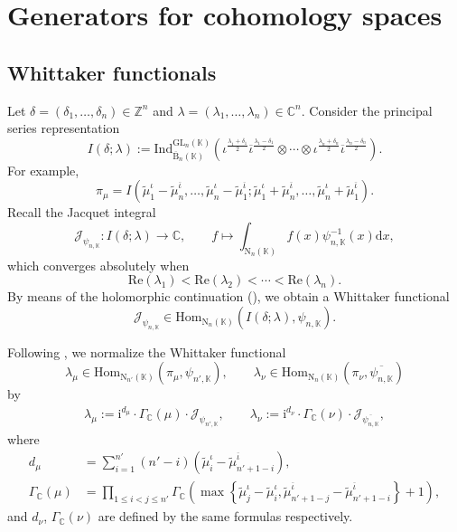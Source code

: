 \documentclass[12pt, a4paper]{amsart}
\newcommand{\CJ}{{\mathcal {J}}}
\newcommand{\RB}{{\mathrm {B}}}
\newcommand{\RN}{{\mathrm {N}}}
\newcommand{\GL}{{\mathrm{GL}}}
\renewcommand{\Re}{{\mathrm{Re}}}
\newcommand{\Z}{\mathbb{Z}}
\newcommand{\C}{\mathbb{C}}
\newcommand{\K}{\mathbb{K}}
\theoremstyle{Theorem}
\theoremstyle{Theorem}
\theoremstyle{Theorem}
\theoremstyle{Theorem}
\theoremstyle{Plain}
\theoremstyle{Definition}
\begin{document}
	
	\section{Generators for cohomology spaces}
	
	\subsection{Whittaker functionals}
	\label{whittaker}
	
	Let $\delta=(\delta_1,\dots,\delta_n)\in\Z^n$ and $\lambda=(\lambda_1,\dots,\lambda_n)\in\C^n$. Consider the principal series representation
	\[
	I(\delta;\lambda):=\mathrm{Ind}^{\GL_n(\K)}_{\overline{\RB}_n(\K)}\left(\iota^{\frac{\lambda_1+\delta_1}{2}}\overline{\iota}^{\frac{\lambda_1-\delta_1}{2}}\otimes\cdots\otimes\iota^{\frac{\lambda_n+\delta_n}{2}}\overline{\iota}^{\frac{\lambda_n-\delta_n}{2}}\right).
	\]
	For example,
	\[
	\pi_{\mu}= I\left(\widetilde{\mu}_1^{\iota}-\widetilde{\mu}_n^{\overline{\iota}},\dots,\widetilde{\mu}_n^{\iota}-\widetilde{\mu}_1^{\overline{\iota}};\widetilde{\mu}_1^{\iota}+\widetilde{\mu}_n^{\overline{\iota}},\dots,\widetilde{\mu}_n^{\iota}+\widetilde{\mu}_1^{\overline{\iota}}\right).
	\]
	Recall the Jacquet integral 
	\[
	\CJ_{\psi_{n,\K}}:I(\delta;\lambda)\to\C,\qquad f\mapsto\int_{\RN_n(\K)}f(x)\psi_{n,\K}^{-1}(x)\mathrm{d}x,
	\]
	which converges absolutely when
	\[
	\Re(\lambda_1)<\Re(\lambda_2)<\cdots<\Re(\lambda_n).
	\]
	By means of the holomorphic continuation (\cite[Theorem 15.4.1]{Wa2}), we obtain a Whittaker functional
	\[
	\CJ_{\psi_{n,\K}}\in\mathrm{Hom}_{\RN_n(\K)}\left(I(\delta;\lambda),\psi_{n,\K}\right).
	\]
	
	Following \cite[Section 2.4.1, Section 5.2]{HMN}, we normalize the Whittaker functional 
	\[
	\lambda_{\mu}\in\mathrm{Hom}_{\RN_{n'}(\K)}(\pi_{\mu},\psi_{n',\K}),\qquad\lambda_{\nu}\in\mathrm{Hom}_{\RN_{n}(\K)}(\pi_{\nu},\overline{\psi_{n,\K}})
	\]
	by
	\[
	\begin{aligned}
		\lambda_{\mu}:=\mathrm{i}^{d_{\mu}}\cdot\Gamma_{\C}(\mu)\cdot\CJ_{\psi_{n',\K}},\qquad \lambda_{\nu}:=\mathrm{i}^{d_{\nu}}\cdot\Gamma_{\C}(\nu)\cdot\CJ_{\overline{\psi_{n,\K}}},
	\end{aligned}
	\]
	where
	\[
	\begin{aligned}
		d_{\mu}&=\sum_{i=1}^{n'}(n'-i)(\widetilde{\mu}_i^{\iota}-\widetilde{\mu}_{n'+1-i}^{\overline{\iota}}),\\
		\Gamma_{\C}(\mu)&=\prod_{1\leq i<j\leq n'}\Gamma_{\C}\left(\max\left\{\widetilde{\mu}_j^{\iota}-\widetilde{\mu}_i^{\iota},\widetilde{\mu}_{n'+1-j}^{\overline{\iota}}-\widetilde{\mu}_{n'+1-i}^{\overline{\iota}}\right\}+1\right), 
	\end{aligned}
	\]
	and $d_{\nu}$, $\Gamma_{\C}(\nu)$ are defined by the same formulas respectively.
	
\end{document}
